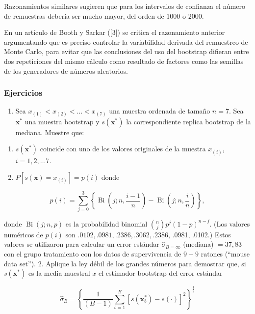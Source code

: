 \documentclass[
]{article}
\providecommand{\tightlist}{%
  \setlength{\itemsep}{0pt}\setlength{\parskip}{0pt}}
\begin{document}
Razonamientos similares sugieren que para los intervalos de confianza el número de remuestras debería ser mucho mayor, del orden de 1000 o 2000.

En un artículo de Booth y Sarkar ({[}3{]}) se critica el razonamiento anterior argumentando que es preciso controlar la variabilidad derivada del remuestreo de Monte Carlo, para evitar que las conclusiones del uso del bootstrap difieran entre dos repeticiones del mismo cálculo como resultado de factores como las semillas de los generadores de números aleatorios.

\subsubsection{Ejercicios}\label{ejercicios}

\begin{enumerate}
\def\labelenumi{\arabic{enumi}.}
\tightlist
\item
  Sea \(x_{(1)}<x_{(2)}<\ldots<x_{(7)}\) una muestra ordenada de tamaño \(n=7\). Sea \(\mathbf{x}^{*}\) una muestra bootstrap y \(s\left(\mathbf{x}^{*}\right)\) la correspondiente replica bootstrap de la mediana. Muestre que:
\end{enumerate}

\begin{enumerate}
\def\labelenumi{\alph{enumi})}
\tightlist
\item
  \(s\left(\mathbf{x}^{*}\right)\) coincide con uno de los valores originales de la muestra \(x_{(i)}\), \(i=1,2, \ldots 7\).
\item
  \(P\left[s(\mathbf{x})=x_{(i)}\right]=p(i)\) donde
\end{enumerate}

\[
p(i)=\sum_{j=0}^{3}\left\{\operatorname{Bi}\left(j ; n, \frac{i-1}{n}\right)-\operatorname{Bi}\left(j ; n, \frac{i}{n}\right)\right\},
\]

donde \(\operatorname{Bi}(j ; n, p)\) es la probabilidad binomial \(\binom{n}{j} p^{j}(1-p)^{n-j}\). (Los valores numéricos de \(p(i)\) son \(.0102, .0981, .2386, .3062, .2386\), .0981, .0102.) Estos valores se utilizaron para calcular un error estándar \(\hat{\sigma}_{B=\infty}\) (mediana) \(=37,83\) con el grupo tratamiento con los datos de supervivencia de \(9+9\) ratones (``mouse data set'').
2. Aplique la ley débil de los grandes números para demostrar que, si \(s\left(\mathbf{x}^{*}\right)\) es la media muestral \(\bar{x}\) el estimador bootstrap del error estándar

\[
\hat{\sigma}_{B}=\left\{\frac{1}{(B-1)} \sum_{b=1}^{B}\left[s\left(\mathbf{x}_{b}^{*}\right)-s(\cdot)\right]^{2}\right\}^{\frac{1}{2}}
\]
\end{document}
